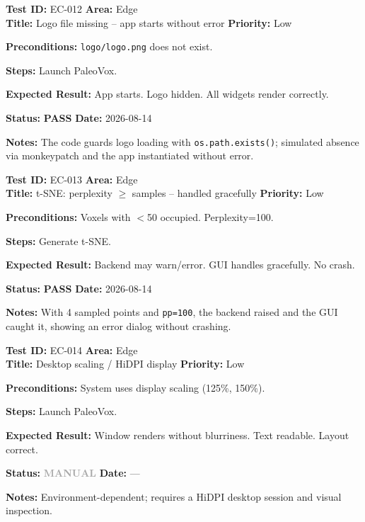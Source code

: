 \documentclass[12pt,a4paper]{article}
\newcommand{\pass}{\textcolor{paleogreen}{\textbf{PASS}}}
\newcommand{\manual}{\textcolor{darkgray}{\textbf{MANUAL}}}
\newcommand{\testheader}[4]{%
  \smallskip
  \noindent\textbf{Test ID:} #1 \hfill \textbf{Area:} #2 \\
  \textbf{Title:} #3 \hfill \textbf{Priority:} #4
}
\newenvironment{testbody}{%
  \begin{description}[leftmargin=2em,style=nextline]
}{%
  \end{description}
  \smallskip
}
\begin{document}
\testheader{EC-012}{Edge}{Logo file missing -- app starts without error}{Low}
\begin{testbody}
  \item[\textbf{Preconditions:}] \texttt{logo/logo.png} does not exist.
  \item[\textbf{Steps:}] Launch PaleoVox.
  \item[\textbf{Expected Result:}] App starts. Logo hidden. All widgets render
        correctly.
  \item[\textbf{Status:}] \pass{} \hspace{1em} \textbf{Date:} 2026-08-14
  \item[\textbf{Notes:}] The code guards logo loading with
        \texttt{os.path.exists()}; simulated absence via monkeypatch and the
        app instantiated without error.
\end{testbody}

\testheader{EC-013}{Edge}{t-SNE: perplexity $\geq$ samples -- handled gracefully}{Low}
\begin{testbody}
  \item[\textbf{Preconditions:}] Voxels with $<$50 occupied. Perplexity=100.
  \item[\textbf{Steps:}] Generate t-SNE.
  \item[\textbf{Expected Result:}] Backend may warn/error. GUI handles
        gracefully. No crash.
  \item[\textbf{Status:}] \pass{} \hspace{1em} \textbf{Date:} 2026-08-14
  \item[\textbf{Notes:}] With 4 sampled points and \texttt{pp=100}, the backend
        raised and the GUI caught it, showing an error dialog without crashing.
\end{testbody}

\testheader{EC-014}{Edge}{Desktop scaling / HiDPI display}{Low}
\begin{testbody}
  \item[\textbf{Preconditions:}] System uses display scaling (125\%, 150\%).
  \item[\textbf{Steps:}] Launch PaleoVox.
  \item[\textbf{Expected Result:}] Window renders without blurriness. Text
        readable. Layout correct.
  \item[\textbf{Status:}] \manual{} \hspace{1em} \textbf{Date:} ---
  \item[\textbf{Notes:}] Environment-dependent; requires a HiDPI desktop
        session and visual inspection.
\end{testbody}
\end{document}
